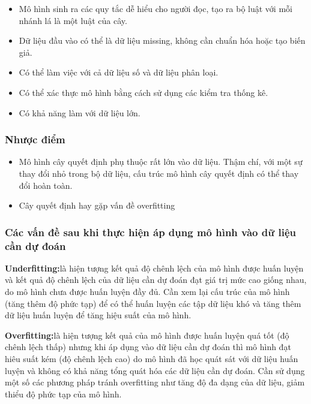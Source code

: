 \documentclass[
]{article}
\begin{document}
\begin{itemize}
\item
  Mô hình sinh ra các quy tắc dễ hiểu cho người đọc, tạo ra bộ luật với
  mỗi nhánh lá là một luật của cây.
\item
  Dữ liệu đầu vào có thể là dữ liệu missing, không cần chuẩn hóa hoặc
  tạo biến giả.
\item
  Có thể làm việc với cả dữ liệu số và dữ liệu phân loại.
\item
  Có thể xác thực mô hình bằng cách sử dụng các kiểm tra thống kê.
\item
  Có khả năng làm với dữ liệu lớn.
\end{itemize}

\subsubsection{Nhược điểm}\label{nhux1b0ux1ee3c-ux111iux1ec3m-2}

\begin{itemize}
\item
  Mô hình cây quyết định phụ thuộc rất lớn vào dữ liệu. Thậm chí, với
  một sự thay đổi nhỏ trong bộ dữ liệu, cấu trúc mô hình cây quyết định
  có thể thay đổi hoàn toàn.
\item
  Cây quyết định hay gặp vấn đề overfitting
\end{itemize}

\subsubsection{Các vấn đề sau khi thực hiện áp dụng mô hình vào dữ liệu
cần dự
đoán}\label{cuxe1c-vux1ea5n-ux111ux1ec1-sau-khi-thux1ef1c-hiux1ec7n-uxe1p-dux1ee5ng-muxf4-huxecnh-vuxe0o-dux1eef-liux1ec7u-cux1ea7n-dux1ef1-ux111ouxe1n}

\textbf{Underfitting:}là hiện tượng kết quả độ chênh lệch của mô hình
được huấn luyện và kết quả độ chênh lệch của dữ liệu cần dự đoán đạt giá
trị mức cao giống nhau, do mô hình chưa được huấn luyện đầy đủ. Cần xem
lại cấu trúc của mô hình (tăng thêm độ phức tạp) để có thể huấn luyện
các tập dữ liệu khó và tăng thêm dữ liệu huấn luyện để tăng hiệu suất
của mô hình.

\textbf{Overfitting:}là hiện tượng kết quả của mô hình được huấn luyện
quá tốt (độ chênh lệch thấp) nhưng khi áp dụng vào dữ liệu cần dự đoán
thì mô hình đạt hiêu suất kém (độ chênh lệch cao) do mô hình đã học quát
sát với dữ liệu huấn luyện và không có khả năng tổng quát hóa các dữ
liệu cần dự đoán. Cần sử dụng một số các phương pháp tránh overfitting
như tăng độ đa dạng của dữ liệu, giảm thiểu độ phức tạp của mô hình.
\end{document}
